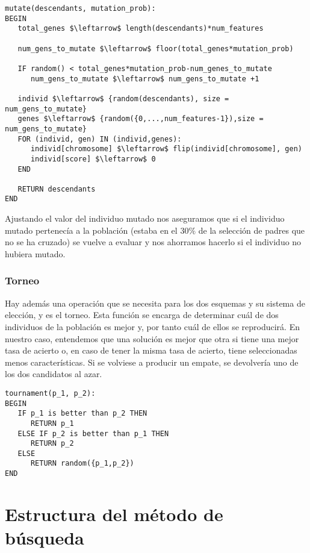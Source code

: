 \documentclass[11pt,leqno]{article}
\begin{document}
\begin{lstlisting}[mathescape=true]
mutate(descendants, mutation_prob):
BEGIN
   total_genes $\leftarrow$ length(descendants)*num_features
                                 
   num_gens_to_mutate $\leftarrow$ floor(total_genes*mutation_prob)
    
   IF random() < total_genes*mutation_prob-num_genes_to_mutate
      num_gens_to_mutate $\leftarrow$ num_gens_to_mutate +1
    
   individ $\leftarrow$ {random(descendants), size = num_gens_to_mutate}
   genes $\leftarrow$ {random({0,...,num_features-1}),size = num_gens_to_mutate}
   FOR (individ, gen) IN (individ,genes):
      individ[chromosome] $\leftarrow$ flip(individ[chromosome], gen)
      individ[score] $\leftarrow$ 0
   END
   
   RETURN descendants
END
\end{lstlisting}

	Ajustando el valor del individuo mutado nos aseguramos que si el individuo mutado pertenecía a la población (estaba en el $30\%$ de la selección de padres que no se ha cruzado) se vuelve a evaluar y nos ahorramos hacerlo si el individuo no hubiera mutado.


\subsubsection{Torneo}

Hay además una operación que se necesita para los dos esquemas y su sistema de elección, y es el torneo. Esta función se encarga de determinar cuál de dos individuos de la población es mejor y, por tanto cuál de ellos se reproducirá. En nuestro caso, entendemos que una solución es mejor que otra si tiene una mejor tasa de acierto o, en caso de tener la misma tasa de acierto, tiene seleccionadas menos características. Si se volviese a producir un empate, se devolvería uno de los dos candidatos al azar.
	
\begin{lstlisting}[mathescape=true]
tournament(p_1, p_2):
BEGIN
   IF p_1 is better than p_2 THEN
      RETURN p_1
   ELSE IF p_2 is better than p_1 THEN
      RETURN p_2
   ELSE
      RETURN random({p_1,p_2})
END
\end{lstlisting}


\section{Estructura del método de búsqueda}
\end{document}
